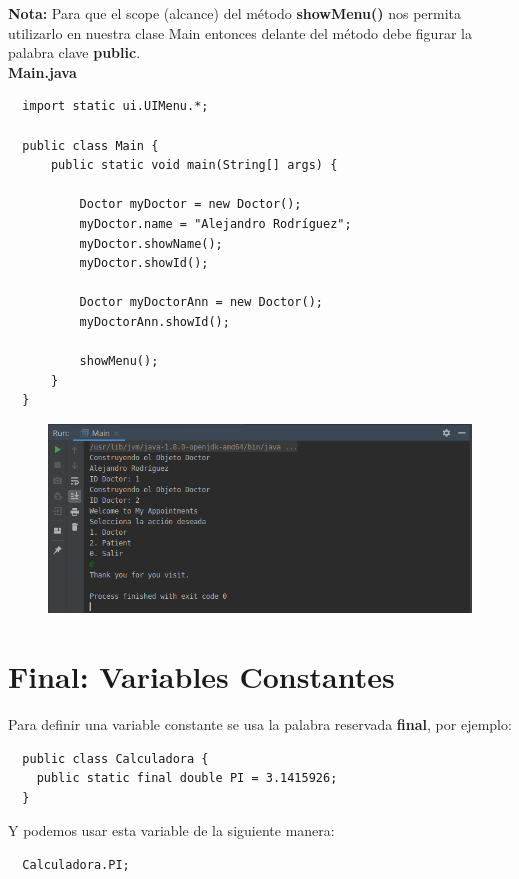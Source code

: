 \documentclass{article}
\begin{document}
\textbf{Nota:} Para que el scope (alcance) del método \textbf{showMenu()} nos
permita utilizarlo en nuestra clase Main entonces delante del método debe
figurar la palabra clave \textbf{public}.\\

\textbf{Main.java}
\begin{verbatim}
  import static ui.UIMenu.*;

  public class Main {
      public static void main(String[] args) {

          Doctor myDoctor = new Doctor();
          myDoctor.name = "Alejandro Rodríguez";
          myDoctor.showName();
          myDoctor.showId();

          Doctor myDoctorAnn = new Doctor();
          myDoctorAnn.showId();

          showMenu();
      }
  }
\end{verbatim}

\begin{figure}[h!]
  \centering
  \includegraphics[scale=0.75]{./Pictures/025_resultados.png}
\end{figure}


\section{Final: Variables Constantes}%
Para definir una variable constante se usa la palabra reservada \textbf{final}, por ejemplo:

\begin{verbatim}
  public class Calculadora {
    public static final double PI = 3.1415926;
  }
\end{verbatim}

Y podemos usar esta variable de la siguiente manera:

\begin{verbatim}
  Calculadora.PI;
\end{verbatim}
\end{document}
